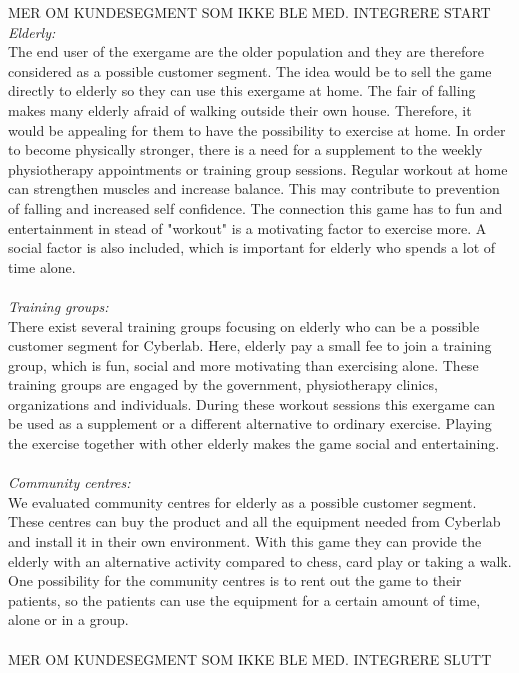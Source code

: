 MER OM KUNDESEGMENT SOM IKKE BLE MED. INTEGRERE START
\emph{Elderly:}\\ 
The end user of the exergame are the older population and they are therefore considered as a possible customer segment. The idea would be to sell the game directly to elderly so they can use this exergame at home. The fair of falling makes many elderly afraid of walking outside their own house. Therefore, it would be appealing for them to have the possibility to exercise at home. In order to become physically stronger, there is a need for a supplement to the weekly physiotherapy appointments or training group sessions. Regular workout at home can strengthen muscles and increase balance.  This may contribute to prevention of falling and increased self confidence. The connection this game has to fun and entertainment in stead of "workout" is a motivating factor to exercise more. A social factor is also included, which is important for elderly who spends a lot of time alone. \\ \\
\emph{Training groups:}\\ 
There exist several training groups focusing on elderly who can be a possible customer segment for Cyberlab. Here, elderly pay a small fee to join a training group, which is fun, social and more motivating than exercising alone. These training groups are engaged by the government, physiotherapy clinics, organizations and individuals. During these workout sessions this exergame can be used as a supplement or a different alternative to ordinary exercise. Playing the exercise together with other elderly makes the game social and entertaining. \\ \\
\emph{Community centres:} \\
We evaluated community centres for elderly as a possible customer segment. These centres can buy the product and all the equipment needed from Cyberlab and install it in their own environment. With this game they can provide the elderly with an alternative activity compared to chess, card play or taking a walk. One possibility for the community centres is to rent out the game to their patients, so the patients can use the equipment for a certain amount of time, alone or in a group. \\ \\

MER OM KUNDESEGMENT SOM IKKE BLE MED. INTEGRERE SLUTT

